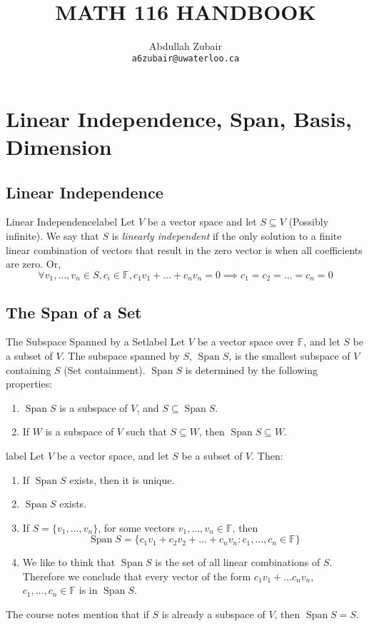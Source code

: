 \documentclass[12pt]{article}
\title{ \normalsize \textsc{}   %
      \\[2.0cm]               %
      \HRule{0.5pt} \\            %
      \LARGE \textbf{\uppercase{Math 116 Handbook}} %
      \HRule{2pt} \\ [0.5cm]    %
      \normalsize     %
    }
\author{
    Abdullah Zubair\\
        \texttt{a6zubair@uwaterloo.ca} \\
}
\theoremstyle{definition}
\newcommand{\F}{\ensuremath{\mathbb{F}}}
\DeclareMathOperator{\Span}{Span}
\begin{document}
\setcounter{section}{2}
\section{Linear Independence, Span, Basis, Dimension}
\subsection{Linear Independence}
\begin{definition}{Linear Independence}{label}
    Let $V$ be a vector space and let $S\subseteq V$ (Possibly infinite). We say that $S$ is \emph{linearly independent} if the only solution to a finite linear combination of vectors that result in the zero vector is when all coefficients are zero. Or,
    $$\forall v_1,\dots,v_n\in S, c_i\in \F, c_1v_1 + \dots + c_nv_n = 0 \implies c_1 = c_2 = \dots = c_n = 0$$

\end{definition}


\subsection{The Span of a Set}
\begin{definition}{The Subspace Spanned by a Set}{label}
Let $V$ be a vector space over $\F$, and let $S$ be a subset of $V$. The subspace spanned by $S$, $\Span S$,
is the smallest subspace of $V$ containing $S$ (Set containment). $\Span S$ is determined by the following
properties:
\begin{enumerate}
    \item $\Span S$ is a subspace of $V$, and $S\subseteq \Span S$.
    \item If $W$ is a subspace of $V$ such that $S\subseteq W$, then $\Span S \subseteq W$.
\end{enumerate}
\end{definition}


\begin{theorem}{}{label}
Let $V$ be a vector space, and let $S$ be a subset of $V$. Then:
\begin{enumerate}
  \item If $\Span S$ exists, then it is unique.
  \item $\Span S$ exists.
  \item If $S = \{v_1,\dots ,v_n\}$, for some vectors $v_1,\dots,v_n \in \F$, then
        $$\Span S = \{c_1v_1 + c_2v_2 + \dots + c_nv_n \colon c_1,\dots, c_n \in \F\}$$
  \item We like to think that $\Span S$ is the set of all linear combinations of $S$. Therefore we conclude that every vector of the form $c_1v_1 + \dots c_nv_n$, $c_1,\dots, c_n \in \F$ is in $\Span S$.
\end{enumerate}
\end{theorem}
The course notes mention that if $S$ is already a subspace of $V$, then $\Span S = S$.
\end{document}
